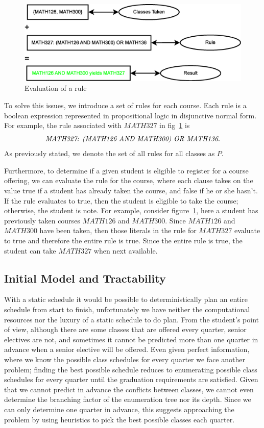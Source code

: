 \documentclass[11pt]{article} %
\begin{document}
\begin{figure} [ht] 
\begin{center} 
\includegraphics[scale=0.4]{prereq_logic_example} 
\end{center} 
\caption{Evaluation of a rule} 
\label{logic_ex} \end{figure}

To solve this issues, we introduce a set of rules for each course. Each rule is
a boolean expression represented in propositional logic in disjunctive normal
form. For example, the rule associated with $MATH327$ in fig~\ref{logic_ex} is
$$ \text{{\it MATH327: (MATH126 AND MATH300) OR MATH136}}.  $$ As previously
stated, we denote the set of all rules for all classes as $P$.

Furthermore, to determine if a given student is eligible to register for
a course offering, we can evaluate the rule for the course, where each clause
takes on the value true if a student has already taken the course, and false if
he or she hasn't. If the rule evaluates to true, then the student is eligible to
take the course; otherwise, the student is note. For example, consider
figure~\ref{logic_ex}, here a student has previously taken courses $MATH126$ and
$MATH300$. Since $MATH126$ and $MATH300$ have been taken, then those literals in
the rule for $MATH327$ evaluate to true and therefore the entire rule is true.
Since the entire rule is true, the student can take $MATH327$ when next
available.

\subsection{Initial Model and Tractability} With a static schedule it would be
possible to deterministically plan an entire schedule from start to finish,
unfortunately we have neither the computational resources nor the luxury of
a static schedule to do plan. From the student’s point of view, although there
are some classes that are offered every quarter, senior electives are not, and
sometimes it cannot be predicted more than one quarter in advance when a senior
elective will be offered. Even given perfect information, where we know the
possible class schedules for every quarter we face another problem; finding the
best possible schedule reduces to enumerating possible class schedules for every
quarter until the graduation requirements are satisfied. Given that we cannot
predict in advance the conflicts between classes, we cannot even determine the
branching factor of the enumeration tree nor its depth. Since we can only
determine one quarter in advance, this suggests approaching the problem by using
heuristics to pick the best possible classes each quarter.
\end{document}
